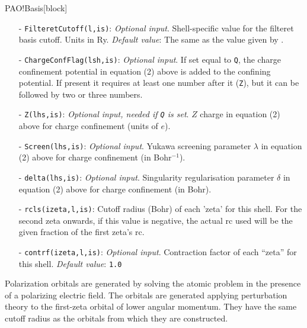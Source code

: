 \begin{fdfentry}{PAO!Basis}[block]
\begin{itemize}
    \item[-]%
    \texttt{FilteretCutoff(l,is)}: \textit{Optional
        input}. Shell-specific value for the filteret basis
    cutoff. Units in Ry.  \textit{Default value}: The same as the
    value given by .

    \item[-]%
    \texttt{ChargeConfFlag(lsh,is)}: \textit{Optional input}. If set
    equal to \texttt{Q}, the charge confinement potential in equation
    (2) above is added to the confining potential. If present it
    requires at least one number after it (\texttt{Z}), but it can be
    followed by two or three numbers.  

    \item[-]%
    \texttt{Z(lhs,is)}: \textit{Optional input, needed if \texttt{Q}
        is set}. $Z$ charge in equation (2) above for charge
    confinement (units of $e$).

    \item[-]%
    \texttt{Screen(lhs,is)}: \textit{Optional input}. Yukawa screening
    parameter $\lambda$ in equation (2) above for charge confinement
    (in Bohr$^{-1}$).

    \item[-]%
    \texttt{delta(lhs,is)}: \textit{Optional input}. Singularity
    regularisation parameter $\delta$ in equation (2) above for charge
    confinement (in Bohr).

    \item[-]%
    \texttt{rcls(izeta,l,is)}: Cutoff radius (Bohr) of each 'zeta' for
    this shell. For the second zeta onwards, if this value is
    negative, the actual rc used will be the given fraction of the
    first zeta's rc.

    \item[-]%
    \texttt{contrf(izeta,l,is)}: \textit{Optional input}.  Contraction
    factor of each ``zeta'' for this shell.
    \textit{Default value}: \texttt{1.0}

\end{itemize}

Polarization orbitals are generated by solving
the atomic problem in the presence of a polarizing electric field. The
orbitals are generated applying perturbation theory to the first-zeta
orbital of lower angular momentum.  They have the same cutoff radius
as the orbitals from which they are constructed.


\end{fdfentry}

